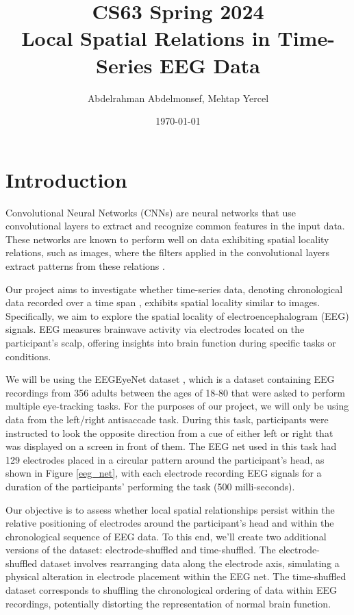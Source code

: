 \documentclass[11pt]{article}
\title{CS63 Spring 2024\\ Local Spatial Relations in Time-Series EEG Data}
\author{Abdelrahman Abdelmonsef, Mehtap Yercel}
\date{\today}
\begin{document}
\maketitle

\section{Introduction}


Convolutional Neural Networks (CNNs) are neural networks that use convolutional layers to extract and recognize common features in the input data. These networks are known to perform well on data exhibiting spatial locality relations, such as images, where the filters applied in the convolutional layers extract patterns from these relations \parencite{meedencnn, mitchellcnn}. 

Our project aims to investigate whether time-series data, denoting chronological data recorded over a time span \parencite{timeseriesdata}, exhibits spatial locality similar to images. Specifically, we aim to explore the spatial locality of electroencephalogram (EEG) signals. EEG measures brainwave activity via electrodes located on the participant's scalp, offering insights into brain function during specific tasks or conditions.

We will be using the EEGEyeNet dataset \parencite{eegeyenet}, which is a dataset containing EEG recordings from 356 adults between the ages of 18-80 that were asked to perform multiple eye-tracking tasks. For the purposes of our project, we will only be using data from the left/right antisaccade task. During this task, participants were instructed to look the opposite direction from a cue of either left or right that was displayed on a screen in front of them. The EEG net used in this task had 129 electrodes placed in a circular pattern around the participant's head, as shown in Figure \ref{eeg_net}, with each electrode recording EEG signals for a duration of the participants' performing the task (500 milli-seconds). 

Our objective is to assess whether local spatial relationships persist within the relative positioning of electrodes around the participant's head and within the chronological sequence of EEG data. To this end, we'll create two additional versions of the dataset: electrode-shuffled and time-shuffled. The electrode-shuffled dataset involves rearranging data along the electrode axis, simulating a physical alteration in electrode placement within the EEG net. The time-shuffled dataset corresponds to shuffling the chronological ordering of data within EEG recordings, potentially distorting the representation of normal brain function.
\end{document}
